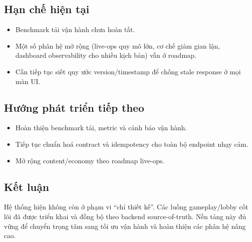 \subsection{Hạn chế hiện tại}
\label{subsec:conclusion-limitations}

\begin{itemize}
    \item Benchmark tải vận hành chưa hoàn tất.
    \item Một số phân hệ mở rộng (live-ops quy mô lớn, cơ chế giảm gian lận, dashboard observability cho nhiều kịch bản) vẫn ở roadmap.
    \item Cần tiếp tục siết quy ước version/\allowbreak timestamp để chống stale response ở mọi màn UI.
\end{itemize}

\subsection{Hướng phát triển tiếp theo}
\label{subsec:conclusion-future}

\begin{itemize}
    \item Hoàn thiện benchmark tải, metric và cảnh báo vận hành.
    \item Tiếp tục chuẩn hoá contract và idempotency cho toàn bộ endpoint nhạy cảm.
    \item Mở rộng content/\allowbreak economy theo roadmap live-ops.
\end{itemize}

\subsection{Kết luận}
\label{subsec:conclusion-final}

Hệ thống hiện không còn ở phạm vi ``chỉ thiết kế''. Các luồng gameplay/\allowbreak lobby cốt lõi đã được triển khai và đồng bộ theo backend source-of-truth. Nền tảng này đủ vững để chuyển trọng tâm sang tối ưu vận hành và hoàn thiện các phân hệ nâng cao.
